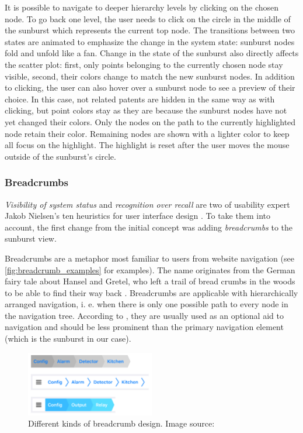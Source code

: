It is possible to navigate to deeper hierarchy levels by clicking on the chosen node.
To go back one level, the user needs to click on the circle in the middle of the sunburst which represents the current top node.
The transitions between two states are animated to emphasize the change in the system state: sunburst nodes fold and unfold like a fan.
Change in the state of the sunburst also directly affects the scatter plot: first, only points belonging to the currently chosen node stay visible, second, their colors change to match the new sunburst nodes.
In addition to clicking, the user can also hover over a sunburst node to see a preview of their choice.
In this case, not related patents are hidden in the same way as with clicking, but point colors stay as they are because the sunburst nodes have not yet changed their colors.
Only the nodes on the path to the currently highlighted node retain their color.
Remaining nodes are shown with a lighter color to keep all focus on the highlight.
The highlight is reset after the user moves the mouse outside of the sunburst's circle.

\subsubsection{Breadcrumbs}
\label{subsubsec:breadcrumbs}
\textit{Visibility of system status} and \textit{recognition over recall} are two of usability expert Jakob Nielsen's ten heuristics for user interface design \cite{Nielsen1994}. 
To take them into account, the first change from the initial concept was adding \textit{breadcrumbs} to the sunburst view.

Breadcrumbs are a metaphor most familiar to users from website navigation (see \autoref{fig:breadcrumb_examples} for examples).
The name originates from the German fairy tale about Hansel and Gretel, who left a trail of bread crumbs in the woods to be able to find their way back \cite{levene2011introduction}.
Breadcrumbs are applicable with hierarchically arranged navigation, i. e. when there is only one possible path to every node in the navigation tree.
According to \cite{Gube2019}, they are usually used as an optional aid to navigation and should be less prominent than the primary navigation element (which is the sunburst in our case).

\begin{figure}[!]
\centering
\includegraphics[width=0.5\textwidth]{img/breadcrumb_examples}
\caption{Different kinds of breadcrumb design. Image source:\cite{breadcrumb}}
\label{fig:breadcrumb_examples}
\end{figure}

